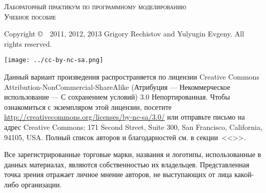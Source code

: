 
\newlength{\centeroffset}
\setlength{\centeroffset}{-0.5\oddsidemargin}
\addtolength{\centeroffset}{0.5\evensidemargin}

\thispagestyle{empty}

\begin{center}
	{\Huge\textsc{Лабораторный практикум по программному моделированию}}
	\vspace{1cm}\\
	{\Large\textsc{Учебное пособие}}
\end{center}

\noindent\hspace*{\centeroffset}
\pagebreak

\thispagestyle{empty}
\begin{small} 
Copyright \copyright~~2011, 2012, 2013 Grigory Rechistov and Yulyugin Evgeny.  All rights reserved.
\begin{center}
	\texttt{[image: ../cc-by-nc-sa.png]}
\end{center}

Данный вариант произведения распространяется по лицензии Creative Commons At\-tri\-bu\-tion-Non\-Com\-mer\-cial-Share\-Alike (Атрибуция — Некоммерческое использование — С сохранением условий) 3.0 Непортированная. Чтобы ознакомиться с экземпляром этой лицензии, посетите \url{http://creativecommons.org/licenses/by-nc-sa/3.0/} или отправьте письмо на адрес Creative Commons: 171 Second Street, Suite 300, San Francisco, California, 94105, USA. 
Полный список авторов и благодарностей см. в секции~<<>>.

Все зарегистрированные торговые марки, названия и логотипы, использованные в данных материалах, являются собственностью их владельцев. Представленная точка зрения отражает личное мнение авторов, не выступающих от лица какой-либо организации.
\end{small}
